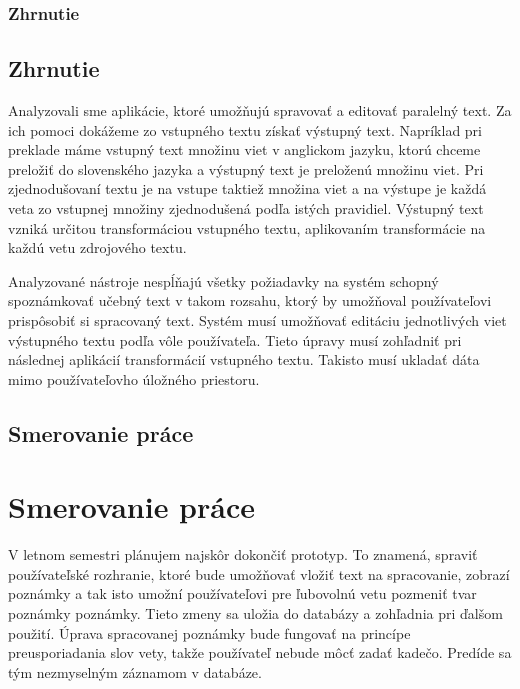 %
%
{
	\subsection{Zhrnutie}
}
{
	\section{Zhrnutie}
}
Analyzovali sme aplikácie, ktoré umožňujú spravovať a editovať paralelný text. Za ich pomoci dokážeme zo vstupného textu získať výstupný text. Napríklad pri preklade máme vstupný text množinu viet v anglickom jazyku, ktorú chceme preložiť do slovenského jazyka a výstupný text je preloženú množinu viet. Pri zjednodušovaní textu je na vstupe taktiež množina viet a na výstupe je každá veta zo vstupnej množiny zjednodušená podľa istých pravidiel. Výstupný text vzniká určitou transformáciou vstupného textu, aplikovaním transformácie na každú vetu zdrojového textu.

Analyzované nástroje nespĺňajú všetky požiadavky na systém schopný spoznámkovať učebný text v takom rozsahu, ktorý by umožňoval používateľovi prispôsobiť si spracovaný text. Systém musí umožňovať editáciu jednotlivých viet výstupného textu podľa vôle používateľa. Tieto úpravy musí zohľadniť pri následnej aplikácií transformácií vstupného textu. Takisto musí ukladať dáta mimo používateľovho úložného priestoru.

%
%
{
	\section{Smerovanie práce} 
}
{
	\chapter{Smerovanie práce}
}
V letnom semestri plánujem najskôr dokončiť prototyp. To znamená, spraviť používateľské rozhranie, ktoré bude umožňovať vložiť text na spracovanie, zobrazí poznámky a tak isto umožní používateľovi pre ľubovolnú vetu pozmeniť tvar poznámky poznámky. Tieto zmeny sa uložia do databázy a zohľadnia pri ďalšom použití. Úprava spracovanej poznámky bude fungovať na princípe preusporiadania slov vety, takže používateľ nebude môcť zadať kadečo. Predíde sa tým nezmyselným záznamom v databáze.

